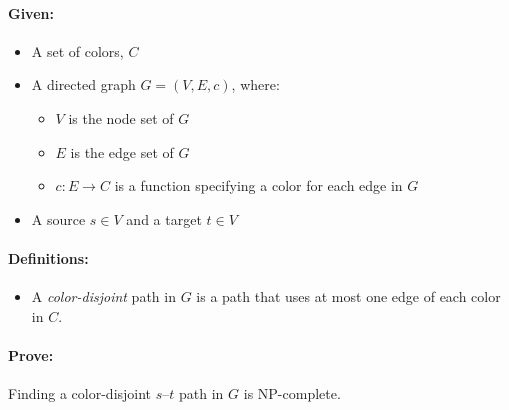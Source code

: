 \documentclass{article}
\begin{document}
  \paragraph{Given:} 
    \begin{itemize}
      \item A set of colors, $C$

      \item A directed graph $G=(V,E,c)$, where:
        \begin{itemize}
          \item $V$ is the node set of $G$
          \item $E$ is the edge set of $G$
          \item $c: E \rightarrow C$ is a function specifying a color
          for each edge in $G$
        \end{itemize}

      \item A source $s \in V$ and a target $t \in V$ 

    \end{itemize}

  \paragraph{Definitions:} 
    \begin{itemize}
      \item A \textit{color-disjoint} path in $G$ is a path that uses
      at most one edge of each color in $C$.
    \end{itemize}

  \paragraph{Prove:} Finding a color-disjoint $s$--$t$ path in $G$ is
  NP-complete.
\end{document}
